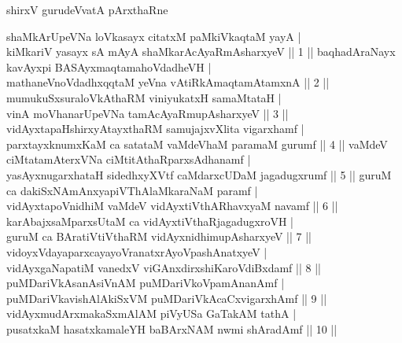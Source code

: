 \thispagestyle{empty}
\centerline{\large shirxV gurudeVvatA pArxthaRne}
\vfill\noindent
\noindent
shaMkArUpeVNa loVkasayx citatxM paMkiVkaqtaM yayA |\\
kiMkariV yasayx sA mAyA shaMkarAcAyaRmAsharxyeV \hfill|| 1 ||
\vfill\noindent
baqhadAraNayx kavAyxpi BASAyxmaqtamahoVdadheVH |\\
mathaneVnoVdadhxqqtaM yeVna vAtiRkAmaqtamAtamxnA \hfill|| 2 ||
\vfill\noindent
mumukuSxsuraloVkAthaRM viniyukatxH samaMtataH |\\
vinA moVhanarUpeVNa tamAcAyaRmupAsharxyeV \hfill|| 3 ||
\vfill\noindent
vidAyxtapaHshirxyAtayxthaRM samujajxvXlita vigarxhamf |\\
parxtayxknumxKaM ca satataM vaMdeV\s haM paramaM gurumf \hfill|| 4 ||
\vfill\noindent
vaMdeV ciMtatamAterxVNa ciMtitAthaRparxsAdhanamf |\\
yasAyxnugarxhataH sidedhxyXVtf caMdarxcUDaM jagadugxrumf \hfill|| 5 ||
\vfill\noindent
guruM ca dakiSxNAmAnxyapiVThAlaMkaraNaM paramf |\\
vidAyxtapoVnidhiM vaMdeV vidAyxtiVthARhavxyaM navamf \hfill|| 6 ||
\vfill\noindent
karAbajxsaMparxsUtaM ca vidAyxtiVthaRjagadugxroVH |\\
guruM ca BAratiVtiVthaRM vidAyxnidhimupAsharxyeV \hfill|| 7 ||
\vfill\noindent
vidoyxVdayaparxcayayoVranatxrAyoVpashAnatxyeV |\\
vidAyxgaNapatiM vanedxV viGAnxdirxshiKaroVdiBxdamf \hfill|| 8 ||
\vfill\noindent
puMDariVkAsanAsiVnAM puMDariVkoVpamAnanAmf |\\
puMDariVkavishAlAkiSxVM puMDariVkAcaCxvigarxhAmf \hfill|| 9 ||
\vfill\noindent
vidAyxmudArxmakaSxmAlAM piVyUSa GaTakAM tathA |\\
pusatxkaM hasatxkamaleYH baBArxNAM nwmi shAradAmf \hfill|| 10 ||
